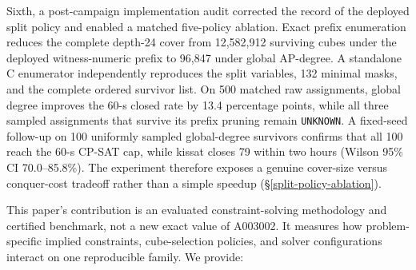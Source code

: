 Sixth, a post-campaign implementation audit corrected the record of the
deployed split policy and enabled a matched five-policy ablation. Exact prefix
enumeration reduces the complete depth-24 cover from 12,582,912 surviving
cubes under the deployed witness-numeric prefix to 96,847 under global
AP-degree. A standalone C enumerator independently reproduces the split
variables, 132 minimal masks, and the complete ordered survivor list. On 500
matched raw assignments, global degree improves the 60-s
closed rate by 13.4 percentage points, while all three sampled assignments
that survive its prefix pruning remain \texttt{UNKNOWN}. A fixed-seed follow-up
on 100 uniformly sampled global-degree survivors confirms that all 100 reach
the 60-s CP-SAT cap, while kissat closes 79 within two hours (Wilson 95\% CI
70.0--85.8\%). The experiment therefore exposes a genuine cover-size versus
conquer-cost tradeoff rather than a simple speedup
(§\ref{split-policy-ablation}).

This paper's contribution is an evaluated constraint-solving methodology and
certified benchmark, not a new exact value of A003002. It measures how
problem-specific implied constraints, cube-selection policies, and solver
configurations interact on one reproducible family. We provide:

